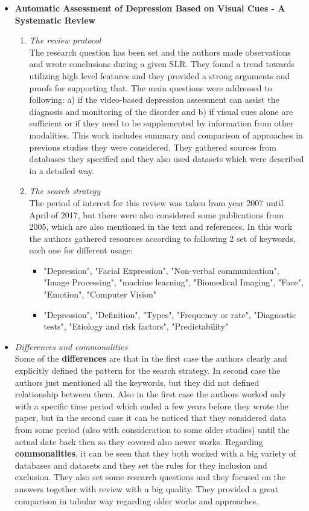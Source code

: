 \begin{itemize}
\item \textbf{Automatic Assessment of Depression Based on Visual Cues - A Systematic Review \cite{SLR1}}
	\begin{enumerate}
	  	\item \textit{The review protocol} \\
	  	The research question has been set and the authors made observations and wrote conclusions during a given SLR. They found a trend towards utilizing high level features and they provided a strong arguments and proofs for supporting that. The main questions were addressed to following: a) if the video-based depression assessment can assist the diagnosis and monitoring of the disorder and b) if visual cues alone are sufficient or if they need to be supplemented by information from other modalities. This work includes summary and comparison of approaches in previous studies they were considered. They gathered sources from databases they specified and they also used datasets which were described in a detailed way. 
		\item \textit{The search strategy} \\
		The period of interest for this review was taken from year 2007 until April of 2017, but there were also considered some publications from 2005, which are also mentioned in the text and references. In this work the authors gathered resources according to following 2 set of keywords, each one for different usage:
		\begin{itemize}
			\item "Depression", "Facial Expression", "Non-verbal communication", "Image Processing", "machine learning", "Biomedical Imaging", "Face", "Emotion", "Computer Vision"
			\item "Depression", "Definition", "Types", "Frequency or rate", "Diagnostic tests", "Etiology and risk factors", "Predictability"
		\end{itemize}
	\end{enumerate}
	\item \textit{Differences and commonalities} \\
		Some of the \textbf{differences} are that in the first case the authors clearly and explicitly defined the pattern for the search strategy. In second case the authors just mentioned all the keywords, but they did not defined relationship between them. Also in the first case the authors worked only with a specific time period which ended a few years before they wrote the paper, but in the second case it can be noticed that they considered data from some period (also with consideration to some older studies) until the actual date back then so they covered also newer works.
		Regarding \textbf{commonalities}, it can be seen that they both worked with a big variety of databases and datasets and they set the rules for they inclusion and exclusion. They also set some research questions and they focused on the answers together with review with a big quality. They provided a great comparison in tabular way regarding older works and approaches.
\end{itemize}

